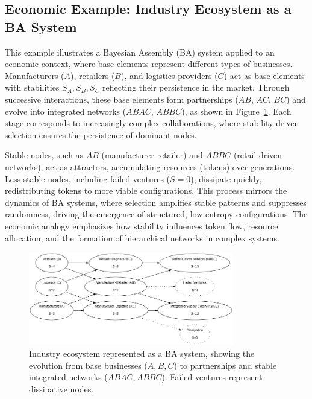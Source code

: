 \documentclass[entropy,article,submit,pdftex,moreauthors]{Definitions/mdpi}
\begin{document}
\subsection{Economic Example: Industry Ecosystem as a BA System}

This example illustrates a Bayesian Assembly (BA) system applied to an economic context, where base elements represent different types of businesses. Manufacturers (\( A \)), retailers (\( B \)), and logistics providers (\( C \)) act as base elements with stabilities \( S_A, S_B, S_C \) reflecting their persistence in the market. Through successive interactions, these base elements form partnerships (\( AB \), \( AC \), \( BC \)) and evolve into integrated networks (\( ABAC \), \( ABBC \)), as shown in Figure~\ref{fig:ba_economic}. Each stage corresponds to increasingly complex collaborations, where stability-driven selection ensures the persistence of dominant nodes. 

Stable nodes, such as \( AB \) (manufacturer-retailer) and \( ABBC \) (retail-driven networks), act as attractors, accumulating resources (tokens) over generations. Less stable nodes, including failed ventures (\( S=0 \)), dissipate quickly, redistributing tokens to more viable configurations. This process mirrors the dynamics of BA systems, where selection amplifies stable patterns and suppresses randomness, driving the emergence of structured, low-entropy configurations. The economic analogy emphasizes how stability influences token flow, resource allocation, and the formation of hierarchical networks in complex systems.

\begin{figure}[h]
    \centering
    \includegraphics[width=0.8\textwidth]{abc_eco.png}
    \caption{Industry ecosystem represented as a BA system, showing the evolution from base businesses (\( A, B, C \)) to partnerships and stable integrated networks (\( ABAC, ABBC \)). Failed ventures represent dissipative nodes.}
    \label{fig:ba_economic}
\end{figure}
\end{document}
